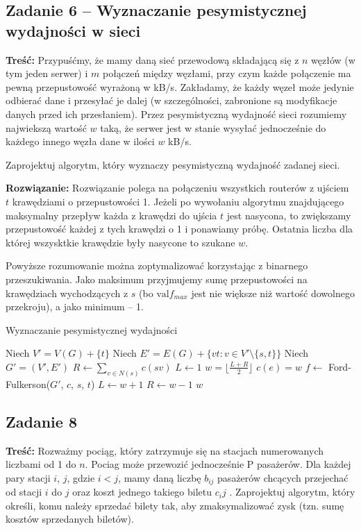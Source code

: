 \subsection{Zadanie 6 -- Wyznaczanie pesymistycznej wydajności w sieci}
\textbf{Treść: } Przypuśćmy, że mamy daną sieć przewodową składającą 
się z $n$ węzłów (w tym jeden serwer) i $m$
połączeń między węzłami, przy czym każde połączenie ma pewną 
przepustowość wyrażoną w kB/s. Zakładamy, że
każdy węzeł może jedynie odbierać dane i przesyłać je 
dalej (w szczególności, zabronione są modyfikacje danych przed
ich przesłaniem). Przez pesymistyczną wydajność sieci 
rozumiemy najwiekszą wartość $w$ taką, że serwer jest w stanie
wysyłać jednocześnie do każdego innego węzła dane w ilości $w$ kB/s.

Zaprojektuj algorytm, który wyznaczy pesymistyczną wydajność zadanej sieci.

\textbf{Rozwiązanie: }
Rozwiązanie polega na połączeniu wszystkich routerów z ujściem $t$ krawędziami 
o przepustowości 1. Jeżeli po wywołaniu algorytmu znajdującego maksymalny
przepływ każda z krawędzi do ujścia $t$ jest nasycona, to 
zwiększamy przepustowość każdej z tych krawędzi o 1 i ponawiamy próbę.
Ostatnia liczba dla której wszysktkie krawędzie były nasycone to 
szukane $w$.


Powyższe rozumowanie można zoptymalizować korzystając z 
binarnego przeszukiwania. Jako maksimum przyjmujemy
sumę przepustowości na krawędziach
wychodzących z $s$ 
(bo $\text{val} f_{max}$ jest nie większe niż
wartość dowolnego przekroju), a jako minimum -- 1.

\begin{algorithm}[H]
	\caption{Wyznaczanie pesymistycznej wydajności}
	\begin{algorithmic}[1]
		\State Niech $V' = V(G) + \{t\}$
		\State Niech $E' = E(G) + \{vt : v \in V' \setminus \{s, t\} \}$
		\State Niech $G' = (V', E')$
		\State $R \gets \sum_{v \in N(s)}c(sv)$
		\State $L \gets 1$
		\State $w = \lfloor \frac{L + R}{2} \rfloor$
		\State $c(e) = w$
		\EndFor 
		\State $f \gets$ Ford-Fulkerson($G'$, $c$, $s$, $t$)
		\State $L \gets w + 1$
		\Else
		\State $R \gets w - 1$
		\EndIf
		\EndWhile
		\State \Return $w$
		\EndProcedure
	\end{algorithmic}
	\label{zad46}
\end{algorithm}

\subsection{Zadanie 8}
\textbf{Treść:} Rozważmy pociąg, który zatrzymuje się na stacjach 
numerowanych liczbami od 1 do $n$. Pociag może
przewozić jednocześnie P pasażerów. Dla każdej pary stacji 
$i$, $j$, gdzie $i < j$, mamy daną liczbę $b_{ij}$ pasażerów chcących
przejechać od stacji $i$ do $j$ oraz koszt jednego takiego biletu $c_ij$ .
Zaprojektuj algorytm, który określi, komu należy sprzedać bilety tak, 
aby zmaksymalizować zysk (tzn. sumę kosztów
sprzedanych biletów).